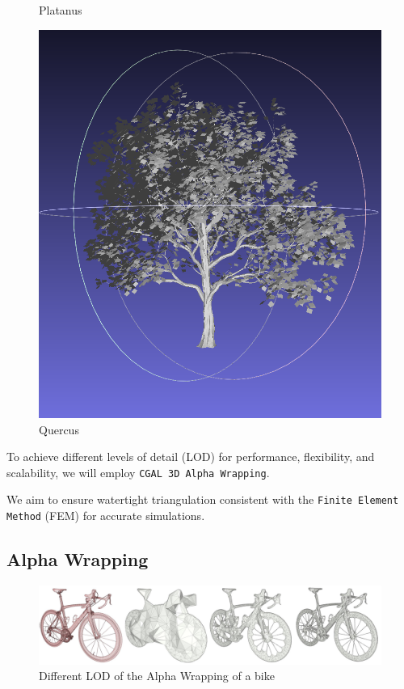 \documentclass[12pt]{article}
\begin{document}
\begin{figure}[H]
\begin{minipage}{0.24\textwidth}
        \caption{Platanus}
    \end{minipage}\hfill
    \begin{minipage}{0.24\textwidth}
        \centering
        \includegraphics[width=\textwidth]{images/quercus.png}
        \caption{Quercus}
    \end{minipage}
\end{figure}

To achieve different levels of detail (LOD) for performance, flexibility,
and scalability, we will employ \texttt{CGAL 3D Alpha Wrapping}\cite{cgal_alpha_wrapper}.

We aim to ensure watertight triangulation consistent with the
\texttt{Finite Element Method} (FEM) for accurate simulations.

\newpage

\subsection{Alpha Wrapping}
\begin{figure}[H]
    \centering
        \centering
        \includegraphics[width=\textwidth]{images/aw3_bike_lod.jpg}
        \caption{Different LOD of the Alpha Wrapping of a bike}
\end{figure}
\end{document}
